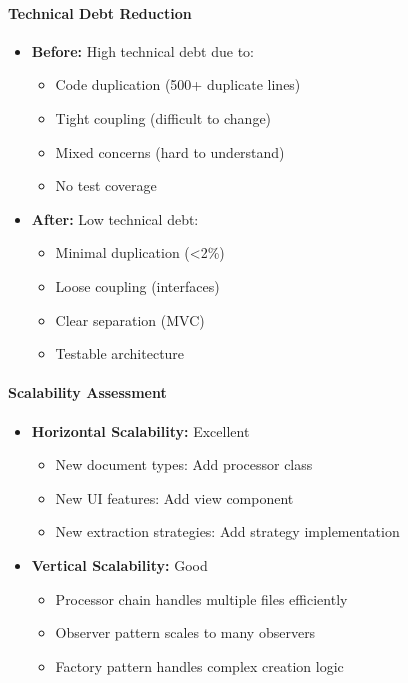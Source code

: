 \documentclass[11pt, a4paper]{article}
\theoremstyle{plain}
\theoremstyle{definition}
\begin{document}
\paragraph{Technical Debt Reduction}
\begin{itemize}
    \item \textbf{Before:} High technical debt due to:
    \begin{itemize}
        \item Code duplication (500+ duplicate lines)
        \item Tight coupling (difficult to change)
        \item Mixed concerns (hard to understand)
        \item No test coverage
    \end{itemize}
    
    \item \textbf{After:} Low technical debt:
    \begin{itemize}
        \item Minimal duplication (<2\%)
        \item Loose coupling (interfaces)
        \item Clear separation (MVC)
        \item Testable architecture
    \end{itemize}
\end{itemize}

\paragraph{Scalability Assessment}
\begin{itemize}
    \item \textbf{Horizontal Scalability:} Excellent
    \begin{itemize}
        \item New document types: Add processor class
        \item New UI features: Add view component
        \item New extraction strategies: Add strategy implementation
    \end{itemize}
    
    \item \textbf{Vertical Scalability:} Good
    \begin{itemize}
        \item Processor chain handles multiple files efficiently
        \item Observer pattern scales to many observers
        \item Factory pattern handles complex creation logic
    \end{itemize}
\end{itemize}
\end{document}
